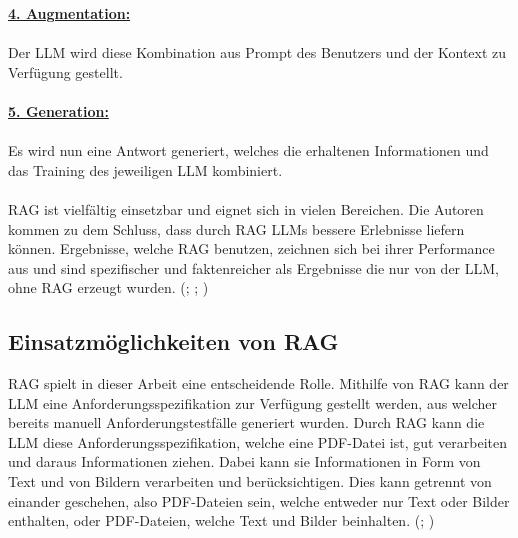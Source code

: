 \documentclass[12pt,toc=bib,toc=listof]{scrreprt}
\begin{document}
\newpage
\noindent\textbf{\underline{4. Augmentation:}}\\
\\
Der LLM wird diese Kombination aus Prompt des Benutzers und der Kontext zu Verfügung gestellt.\\
\\
\textbf{\underline{5. Generation:}}\\
\\
Es wird nun eine Antwort generiert, welches die erhaltenen Informationen und das Training des jeweiligen LLM kombiniert.\\
\\
RAG ist vielfältig einsetzbar und eignet sich in vielen Bereichen. Die Autoren \parencite{Gao2024, Lewis2021, Salemi2024} kommen zu dem Schluss, dass durch RAG LLMs bessere Erlebnisse liefern können. Ergebnisse, welche RAG benutzen, zeichnen sich bei ihrer Performance aus und sind spezifischer und faktenreicher als Ergebnisse die nur von der LLM, ohne RAG erzeugt wurden. (\cite{Gao2024}; \cite{Lewis2021}; \cite{Salemi2024})

\subsection{Einsatzmöglichkeiten von RAG} %
\label{sec:einsatzmöglichkeitenVonRAG}
RAG spielt in dieser Arbeit eine entscheidende Rolle. Mithilfe von RAG kann der LLM eine Anforderungsspezifikation zur Verfügung gestellt werden, aus welcher bereits manuell Anforderungstestfälle generiert wurden. Durch RAG kann die LLM diese Anforderungsspezifikation, welche eine PDF-Datei ist, gut verarbeiten und daraus Informationen ziehen. Dabei kann sie Informationen in Form von Text und von Bildern verarbeiten und berücksichtigen. Dies kann getrennt von einander geschehen, also PDF-Dateien sein, welche entweder nur Text oder Bilder enthalten, oder PDF-Dateien, welche Text und Bilder beinhalten. (\cite{Gao2024}; \cite{Wu2024})
\end{document}
